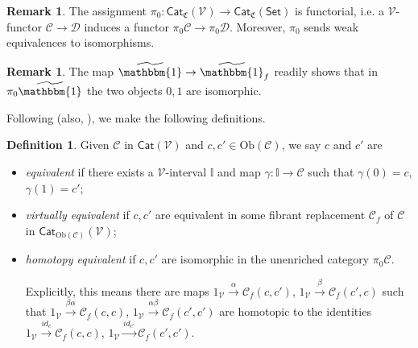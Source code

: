 \documentclass[a4paper,10pt
,draft
]{article}%
\numberwithin{equation}{section}
\numberwithin{figure}{section}
\theoremstyle{definition} %
\newtheorem{definition}[equation]{Definition}%
\newtheorem{remark}[equation]{Remark}%
\newcommand{\Cat}{\mathsf{Cat}}
\newcommand{\V}{\ensuremath{\mathcal V}}
\newcommand{\1}{\ensuremath{\mathbbm 1}}%
\begin{document}
\begin{remark}
      The assignment
      $\pi_0\colon \mathsf{Cat}_{\mathfrak{C}}(\V)
\to \mathsf{Cat}_{\mathfrak{C}}(\mathsf{Set})$ is functorial,
i.e. a $\V$-functor
$\mathcal{C} \to \mathcal{D}$
induces a functor 
$\pi_0\mathcal{C} \to \pi_0\mathcal{D}$.
Moreover, $\pi_0$ sends weak equivalences to isomorphisms.
\end{remark}







\begin{remark}\label{NATISO REM}
The map $\widetilde{\mathbbm{1}} \to \widetilde{\mathbbm{1}}_f$
readily shows that in $\pi_0 \widetilde{\mathbbm{1}}$
the two objects $0,1$ are isomorphic.
\end{remark}




Following \cite[Def. 2.6]{BM13} (also, \cite{Cav}),
we make the following definitions.

\begin{definition}\label{EQUIV_DEF}
	Given $\mathcal{C}$ in  $\Cat(\V)$ and $c,c'\in\mathrm{Ob}(\mathcal C)$, we say $c$ and $c'$ are
\begin{itemize}
	\item {\em equivalent} if there exists a $\V$-interval $\mathbb{I}$
	and map $\gamma: \mathbb{I} \to \mathcal C$ such that
	$\gamma(0)= c$, $\gamma(1)= c'$;
	\item {\em virtually equivalent} if $c,c'$ are equivalent in some fibrant replacement
	$\mathcal C_f$ of $\mathcal C$ in $\Cat_{\mathrm{Ob}(\mathcal C)}(\V)$;
	\item {\em homotopy equivalent} if $c,c'$ are isomorphic in the unenriched category $\pi_0 \mathcal C$.

	Explicitly, this means there are maps 
	$1_\V \xrightarrow{\alpha} \mathcal C_f(c,c')$, 
	$1_\V \xrightarrow{\beta} \mathcal C_f(c',c)$ such that
	$1_{\V} \xrightarrow{\beta \alpha} \mathcal C_f(c,c)$,
	$1_{\V} \xrightarrow{\alpha \beta} \mathcal C_f(c',c')$
	are homotopic to the identities
	$1_{\V} \xrightarrow{id_c} \mathcal C_f(c,c)$,
	$1_{\V} \xrightarrow{id_{c'}} \mathcal C_f(c',c')$.
\end{itemize}
\end{definition}
\end{document}
